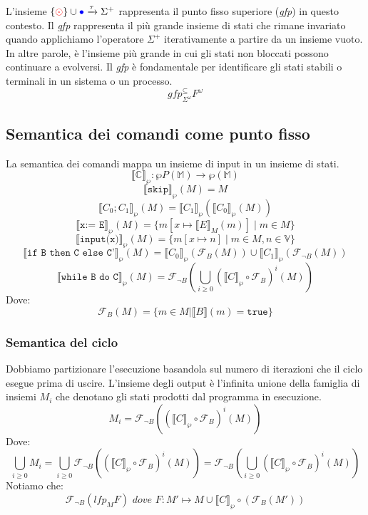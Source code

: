 L'insieme $\{\textcolor{red}{\odot}\} \cup \textcolor{blue}{\bullet}\xrightarrow[]
{\tau} \Sigma^{+}$ rappresenta il punto fisso superiore
(\textit{gfp}) in questo contesto. Il \textit{gfp} rappresenta il
più grande insieme di stati che rimane invariato quando applichiamo
l'operatore $\Sigma^{+}$ iterativamente a partire da un insieme
vuoto. In altre parole, è l'insieme più grande in cui gli stati
non bloccati possono continuare a evolversi. Il \textit{gfp} è
fondamentale per identificare gli stati stabili o terminali in un
sistema o un processo.
\[
  \textit{gfp}^{\subseteq}_{\Sigma^\omega}F^\omega
\]

\subsection{Semantica dei comandi come punto fisso}
La semantica dei comandi mappa un insieme di input in un 
insieme di stati.
\[
  \llbracket \mathbb{C} \rrbracket_\wp : \wp{P}(\mathbb{M}) \rightarrow \wp(\mathbb{M})
\]
\[
  \llbracket \texttt{skip} \rrbracket_\wp(M) = M
\]
\[
  \llbracket {C_0;C_1} \rrbracket_\wp(M) = \llbracket {C_1} \rrbracket_\wp(\llbracket {C_0} \rrbracket_\wp(M))
\]
\[
  \llbracket {\texttt{x:= E}} \rrbracket_\wp(M) = \{m[x \mapsto \llbracket {E} \rrbracket_M(m)] \mid m \in M\}
\]
\[
  \llbracket \texttt{input(x)} \rrbracket_\wp(M) = \{m[x \mapsto n] \mid m \in M, n \in \mathbb{V}\}
\]
\[
  \llbracket {\texttt{if B then C else C'}} \rrbracket_\wp(M) = \llbracket C_0 \rrbracket_\wp 
  (\mathcal{F}_B (M)) \cup \llbracket C_1 \rrbracket_\wp (\mathcal{F}_{\neg B} (M))
\]
\[
  \llbracket {\texttt{while B do C}} \rrbracket_\wp(M) = \mathcal{F}_{\neg B}
  \left ( \bigcup_{i \geq 0}(\llbracket C \rrbracket_\wp \circ 
  \mathcal{F}_B)^i (M)\right )
\]
Dove:
\[
  \mathcal{F}_B(M)= \{m \in M | 
  \llbracket B \rrbracket (m) = \texttt{true}\}
\]
\subsubsection{Semantica del ciclo}
Dobbiamo partizionare l'esecuzione basandola sul numero di iterazioni
che il ciclo esegue prima di uscire.
L'insieme degli output è l'infinita unione della famiglia di insiemi $M_i$
che denotano gli stati prodotti dal programma in esecuzione.
\[
  M_i = \mathcal{F}_{\neg B}\left ( (\llbracket C \rrbracket_\wp \circ \mathcal{F}_B)^i (M)\right )
\]
Dove:
\[
\bigcup_{i \geq 0}M_i = \bigcup_{i\geq 0} \mathcal{F}_{\neg B}\left ( (\llbracket C \rrbracket_\wp \circ \mathcal{F}_B)^i (M)\right )
= \mathcal{F}_{\neg B}\left ( \bigcup_{i \geq 0}(\llbracket C \rrbracket_\wp \circ \mathcal{F}_B)^i (M)\right )
\]
Notiamo che:
\[
  \mathcal{F}_{\neg B}(\textit{lfp}_M F) \textit{ dove }F : M' \mapsto M \cup \llbracket C \rrbracket_\wp  \circ (\mathcal{F}_B(M'))
\]
